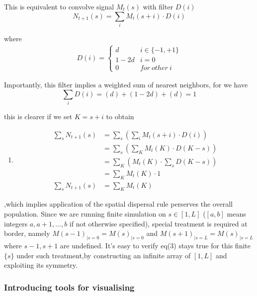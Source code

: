 \documentclass[a4paperpaper,]{article}
\providecommand{\tightlist}{%
  \setlength{\itemsep}{0pt}\setlength{\parskip}{0pt}}
\begin{document}
This is equivalent to convolve signal \(M_{t}(s)\) with filter \(D(i)\)
\[
N_{t+1}(s) = \sum_{i } M_{t}(s+i) \cdot  D(i) 
\]

where \[
\begin{array}{ll}
D(i) = \left\{
  \begin{array}{ll}
            d & i \in \{- 1,+1\}\\
            1-2d & i= 0 \\
            0 & for~other~i
  \end{array}
\right.
\end{array}
\]

Importantly, this filter implies a weighted sum of nearest neighbors,
for we have \[
\sum_i{D(i)} = (d) + (1-2d) + (d) = 1
\]

this is clearer if we set \(K = s+i\) to obtain

\begin{enumerate}
\def\labelenumi{(\arabic{enumi})}
\setcounter{enumi}{2}
\tightlist
\item
  \[
  \begin{aligned}
  \sum_{s}{N_{t+1}(s)} &= \sum_{s}{ \left( \sum_{i } M_{t}(s+i) \cdot  D(i) \right) } \\
                   &= \sum_{s}  \left( \sum_{K} M_{t}(K) \cdot  D(K-s)  \right)  \\
                   &= \sum_{K}  \left( M_t(K) \cdot  \sum_{s}{D(K-s)}   \right) \\
                   &= \sum_{K}M_t(K) \cdot  1 \\
  \sum_{s}{N_{t+1}(s)} &= \sum_{K}M_t(K)
  \end{aligned} 
  \]
\end{enumerate}

,which implies application of the spatial dispersal rule perserves the
overall population. Since we are running finite simulation on
\(s \in [1,L]\) (\([a,b]\) means integers \(a,a+1,...,b\) if not
otherwise specified), special treatment is required at border, namely
\(M(s-1)_{|s = 0}= M(s)_{|s = 0}\) and \(M(s+1)_{|s = L}=M(s)_{|s = L}\)
where \(s-1,s+1\) are undefined. It's easy to verify eq(3) stays true
for this finite \(\{s\}\) under such treatment,by constructing an
infinite array of \([1,L]\) and exploiting its symmetry.

\subsubsection{Introducing tools for
visualising}\label{introducing-tools-for-visualising}
\end{document}
